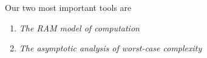 Our two most important tools are 
\begin{enumerate}
	\item
	  \emph{The RAM model of
			computation}
	\item
	  \emph{The asymptotic analysis of worst-case complexity}
\end{enumerate}
